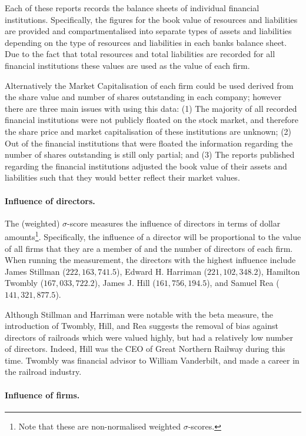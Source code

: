 Each of these reports records the balance sheets of individual financial institutions. Specifically, the figures for the book value of resources and liabilities are provided and compartmentalised into separate types of assets and liabilities depending on the type of resources and liabilities in each banks balance sheet. Due to the fact that total resources and total liabilities are recorded for all financial institutions these values are used as the value of each firm.

Alternatively the Market Capitalisation of each firm could be used derived from the share value and number of shares outstanding in each company; however there are three main issues with using this data: (1) The majority of all recorded financial institutions were not publicly floated on the stock market, and therefore the share price and market capitalisation of these institutions are unknown; (2) Out of the financial institutions that were floated the information regarding the number of shares outstanding is still only partial; and (3) The reports published regarding the financial institutions adjusted the book value of their assets and liabilities such that they would better reflect their market values.

\paragraph{Influence of directors.}

The (weighted) $\sigma$-score measures the influence of directors in terms of dollar amounts\footnote{Note that these are non-normalised weighted $\sigma$-scores.}. Specifically, the influence of a director will be proportional to the value of all firms that they are a member of and the number of directors of each firm. When running the measurement, the directors with the highest influence include James Stillman ($222,163,741.5$), Edward H. Harriman ($221,102,348.2$), Hamilton Twombly ($167,033,722.2$), James J. Hill ($161,756,194.5$), and Samuel Rea ($141,321,877.5$).

Although Stillman and Harriman were notable with the beta measure, the introduction of Twombly, Hill, and Rea suggests the removal of bias against directors of railroads which were valued highly, but had a relatively low number of directors. Indeed, Hill was the CEO of Great Northern Railway during this time. Twombly was financial advisor to William Vanderbilt, and made a career in the railroad industry.

\paragraph{Influence of firms.}

